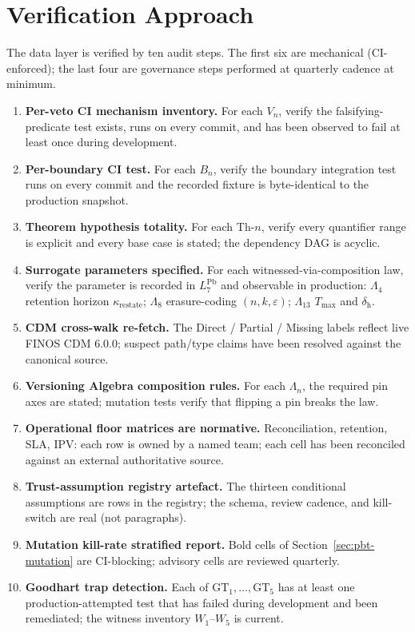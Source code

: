 \documentclass[11pt,a4paper]{article}
\begin{document}
\section{Verification Approach}
\label{sec:verification}

The data layer is verified by ten audit steps. The first six are mechanical (CI-enforced); the last four are governance steps performed at quarterly cadence at minimum.

\begin{enumerate}[nosep,leftmargin=*]
\item \textbf{Per-veto CI mechanism inventory.} For each $V_n$, verify the falsifying-predicate test exists, runs on every commit, and has been observed to fail at least once during development.
\item \textbf{Per-boundary CI test.} For each $B_n$, verify the boundary integration test runs on every commit and the recorded fixture is byte-identical to the production snapshot.
\item \textbf{Theorem hypothesis totality.} For each $\mathrm{Th}\textrm{-}n$, verify every quantifier range is explicit and every base case is stated; the dependency DAG is acyclic.
\item \textbf{Surrogate parameters specified.} For each witnessed-via-composition law, verify the parameter is recorded in $L_7^{\mathrm{Pb}}$ and observable in production: $\Lambda_4$ retention horizon $\kappa_{\mathrm{restate}}$; $\Lambda_8$ erasure-coding $(n,k,\varepsilon)$; $\Lambda_{13}$ $T_{\max}$ and $\delta_{\mathrm{h}}$.
\item \textbf{CDM cross-walk re-fetch.} The Direct / Partial / Missing labels reflect live FINOS CDM 6.0.0; suspect path/type claims have been resolved against the canonical source.
\item \textbf{Versioning Algebra composition rules.} For each $\Lambda_n$, the required pin axes are stated; mutation tests verify that flipping a pin breaks the law.
\item \textbf{Operational floor matrices are normative.} Reconciliation, retention, SLA, IPV: each row is owned by a named team; each cell has been reconciled against an external authoritative source.
\item \textbf{Trust-assumption registry artefact.} The thirteen conditional assumptions are rows in the registry; the schema, review cadence, and kill-switch are real (not paragraphs).
\item \textbf{Mutation kill-rate stratified report.} Bold cells of Section~\ref{sec:pbt-mutation} are CI-blocking; advisory cells are reviewed quarterly.
\item \textbf{Goodhart trap detection.} Each of $\mathrm{GT}_1, \dots, \mathrm{GT}_5$ has at least one production-attempted test that has failed during development and been remediated; the witness inventory $W_1$--$W_5$ is current.
\end{enumerate}
\end{document}
